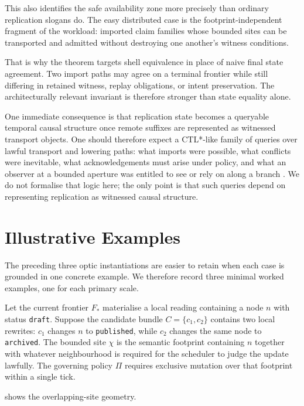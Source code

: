 \documentclass{aion}
\begin{document}
This also identifies the safe availability zone more precisely than ordinary
replication slogans do. The easy distributed case is the footprint-independent
fragment of the workload: imported claim families whose bounded sites can be
transported and admitted without destroying one another's witness conditions.

That is why the theorem targets shell equivalence in place of naive final
state agreement. Two import paths may agree on a terminal frontier while still
differing in retained witness, replay obligations, or intent preservation. The
architecturally relevant invariant is therefore stronger than state equality
alone.

One immediate consequence is that replication state becomes a queryable temporal
causal structure once remote suffixes are represented as witnessed transport
objects. One should therefore expect a CTL*-like family of queries over lawful
transport and lowering paths: what imports were possible, what conflicts were
inevitable, what acknowledgements must arise under policy, and what an observer
at a bounded aperture was entitled to see or rely on along a branch
\cite{EmersonHalpern1986}. We do not formalise that logic here; the only point
is that such queries depend on representing replication as witnessed causal
structure.

\clearpage
\section{Illustrative Examples}
\label{sec:examples}

The preceding three optic instantiations are easier to retain when each case is grounded in one concrete example. We therefore record three minimal worked examples, one for each primary scale.


Let the current frontier \(F_*\) materialise a local reading containing a node \(n\) with status \texttt{draft}. Suppose the candidate bundle \(C = \{c_1, c_2\}\) contains two local rewrites: \(c_1\) changes \(n\) to \texttt{published}, while \(c_2\) changes the same node to \texttt{archived}. The bounded site \(\chi\) is the semantic footprint containing \(n\) together with whatever neighbourhood is required for the scheduler to judge the update lawfully. The governing policy \(\Pi\) requires exclusive mutation over that footprint within a single tick.

 shows the overlapping-site geometry.
\end{document}
